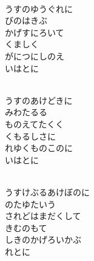 \documentclass[10pt,b5j]{tarticle} %
\begin{document}
\vspace{1.5em} %
\newcommand{\linespace}{0.5em} %
\newcommand{\blocksize}{0.5\hsize} %
\newcommand{\itemmargin}{3em} %
\begin{enumerate} %
    \setlength{\itemindent}{\itemmargin} %
    \begin{minipage}[c]{\blocksize}
    
        \vspace{\linespace}
        \item~\\
        うすのゆうぐれに\\
        びのはきぶ\\
        かげすにろいて\\
        くましく\\
        がにつにしのえ\\
        いはとに
        
    \end{minipage}
    \begin{minipage}[c]{\blocksize}
        
        \vspace{\linespace}
        \item~\\
        うすのあけどきに\\
        みわたるる\\
        ものえてたくく\\
        くもるしさに\\
        れゆくものこのに\\
        いはとに
        
    \end{minipage}
    \begin{minipage}[c]{\blocksize}
        
        \vspace{\linespace}
        \item~\\
        うすけぶるあけぼのに\\
        のたゆたいう\\
        されどはまだくして\\
        きむのもて\\
        しきのかげろいかぶ\\
        れとに
        

\end{minipage}
\end{enumerate}
\end{document}
